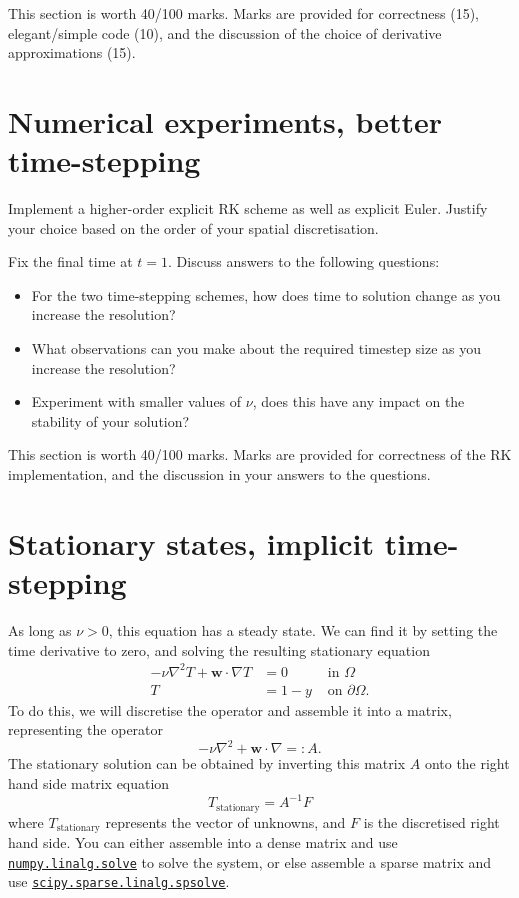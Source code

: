 \documentclass[11pt,a4paper]{article}
\renewcommand{\vec}[1]{\ensuremath{\mathbf{#1}}}
\begin{document}
This section is worth 40/100 marks. Marks are provided for
correctness (15), elegant/simple code (10), and the discussion of the
choice of derivative approximations (15).

\section{Numerical experiments, better time-stepping}
\label{sec:part2}

Implement a higher-order explicit RK scheme as well as explicit Euler.
Justify your choice based on the order of your spatial discretisation.

Fix the final time at $t = 1$. Discuss answers to the following
questions:
\begin{itemize}
\item For the two time-stepping schemes, how does time to solution
  change as you increase the resolution?
\item What observations can you make about the required timestep size
  as you increase the resolution?
\item Experiment with smaller values of $\nu$, does this have any
  impact on the stability of your solution?
\end{itemize}

This section is worth 40/100 marks. Marks are provided for
correctness of the RK implementation, and the discussion in your
answers to the questions.

\section{Stationary states, implicit time-stepping}
\label{sec:part3}
As long as $\nu > 0$, this equation has a steady state. We can find it
by setting the time derivative to zero, and solving the resulting
stationary equation
\begin{equation}
  \label{eq:4}
  \begin{aligned}
  -\nu \nabla^2 T + \vec{w} \cdot \nabla T &= 0 &\text{ in } \Omega\\
  T &= 1 - y &\text{ on } \partial\Omega.
  \end{aligned}
\end{equation}
To do this, we will discretise the operator and assemble it into a
matrix, representing the operator
\begin{equation}
  \label{eq:7}
  -\nu \nabla^2 + \vec{w} \cdot \nabla =: A.
\end{equation}
The stationary solution can be obtained by inverting this matrix $A$
onto the right hand side
matrix equation
\begin{equation}
  \label{eq:5}
  T_\text{stationary} = A^{-1} F
\end{equation}
where $T_\text{stationary}$ represents the vector of unknowns, and $F$
is the discretised right hand side. You can either assemble into a
dense matrix and use
\href{https://docs.scipy.org/doc/numpy/reference/generated/numpy.linalg.solve.html}{\underline{\texttt{numpy.linalg.solve}}}
to solve the system, or else assemble a sparse matrix and use
\href{https://docs.scipy.org/doc/scipy/reference/sparse.linalg.html}{\underline{\texttt{scipy.sparse.linalg.spsolve}}}.
\end{document}
